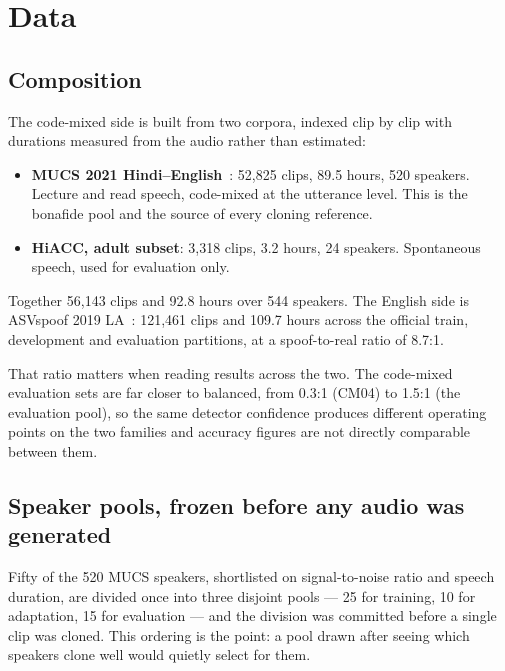 \section{Data}
\label{sec:dataset}

\subsection{Composition}

The code-mixed side is built from two corpora, indexed clip by clip with durations
measured from the audio rather than estimated:

\begin{itemize}
  \item \textbf{MUCS 2021 Hindi--English}~\cite{diwan2021mucs}: 52{,}825 clips,
    89.5 hours, 520 speakers. Lecture and read speech, code-mixed at the utterance
    level. This is the bonafide pool and the source of every cloning reference.
  \item \textbf{HiACC, adult subset}: 3{,}318 clips, 3.2 hours, 24 speakers.
    Spontaneous speech, used for evaluation only.
\end{itemize}

Together 56{,}143 clips and 92.8 hours over 544 speakers. The English side is
ASVspoof 2019 LA~\cite{todisco2019asvspoof}: 121{,}461 clips and 109.7 hours across
the official train, development and evaluation partitions, at a spoof-to-real ratio
of 8.7:1.

That ratio matters when reading results across the two. The code-mixed evaluation
sets are far closer to balanced, from 0.3:1 (CM04) to 1.5:1 (the evaluation pool), so the
same detector confidence produces
different operating points on the two families and accuracy figures are not directly
comparable between them.

\subsection{Speaker pools, frozen before any audio was generated}

Fifty of the 520 MUCS speakers, shortlisted on signal-to-noise ratio and speech
duration, are divided once into three disjoint pools --- 25 for training, 10 for
adaptation, 15 for evaluation --- and the division was committed before a single clip
was cloned. This ordering is the point: a pool drawn after seeing which
speakers clone well would quietly select for them.


